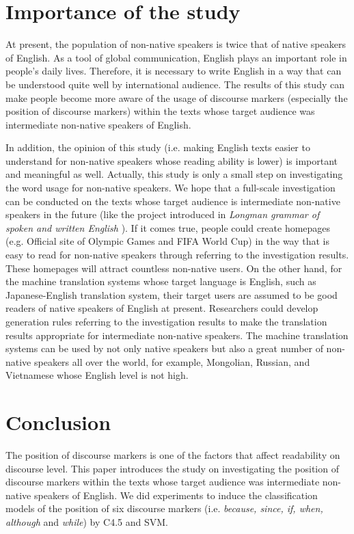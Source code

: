\documentclass[english]{jnlp_1.3e}
\begin{document}
\section{Importance of the study}  

At present, the population of non-native speakers is twice that of native
speakers of English. As a tool of global communication, English plays an important 
role in people's daily lives. Therefore, it is necessary to write English 
in a way that can be understood quite well by international audience. 
The results of this study can make people become more aware of
the usage of discourse markers (especially the position of discourse 
markers) within the texts whose target audience was intermediate 
non-native speakers of English. 

In addition, the opinion of this study (i.e. making English 
texts easier to understand for non-native speakers whose reading 
ability is lower) is important and meaningful as well. Actually, this study is 
only a small step on investigating the word usage for
non-native speakers. We hope that a full-scale investigation can 
be conducted on the texts whose target audience is intermediate 
non-native speakers in the future (like the project introduced in 
\textit{Longman grammar of spoken and written English} \cite{Biber99}). 
If it comes true, people could create homepages 
(e.g. Official site of Olympic Games and FIFA 
World Cup) in the way that is easy to read for non-native 
speakers through referring to the investigation results. These 
homepages will attract countless non-native users. On the other hand, 
for the machine translation systems whose target language is English, 
such as Japanese-English translation system, their target 
users are assumed to be good readers of native speakers of English at
present. Researchers could develop generation rules referring to
the investigation results to make the translation results appropriate 
for intermediate non-native speakers. The machine translation systems 
can be used by not only native speakers but also a great number of 
non-native speakers all over the world, for example, Mongolian, Russian, 
and Vietnamese whose English level is not high. 




\section{Conclusion}  

The position of discourse markers is one of the factors that affect
readability on discourse level. This paper introduces the study on investigating 
the position of discourse markers within the texts whose target audience was 
intermediate non-native speakers of English. We did experiments to induce 
the classification models of the position of six discourse markers 
(i.e. \textit{because, since, if, when, although} and \textit{while}) by C4.5 and SVM. 
\end{document}
